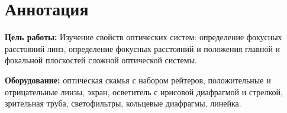 \section{Аннотация}
\textbf{Цель работы:}
Изучение свойств оптических систем: определение фокусных расстояний линз, определение фокусных расстояний и положения главной и фокальной плоскостей сложной оптической системы.

\textbf{Оборудование:}
оптическая скамья с набором рейтеров, положительные и отрицательные линзы, экран, осветитель с ирисовой диафрагмой и стрелкой, зрительная труба, светофильтры, кольцевые диафрагмы, линейка.
